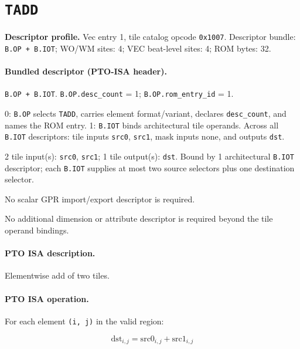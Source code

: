 \section{\texttt{TADD}}
\noindent\textbf{Descriptor profile.} Vec entry 1, tile catalog opcode \texttt{0x1007}. Descriptor bundle: \texttt{B.OP + B.IOT}; WO/WM sites: 4; VEC beat-level sites: 4; ROM bytes: 32.\par\smallskip
{}
\paragraph{Bundled descriptor (PTO-ISA header).}
\begin{description}[leftmargin=0.18\linewidth,style=nextline]
\item[Bundle] \texttt{B.OP + B.IOT}. \texttt{B.OP.desc\_count} = 1; \texttt{B.OP.rom\_entry\_id} = 1.
\item[Assembly] 0: \texttt{B.OP} selects \texttt{TADD}, carries element format/variant, declares \texttt{desc\_count}, and names the ROM entry. 1: \texttt{B.IOT} binds architectural tile operands. Across all \texttt{B.IOT} descriptors: tile inputs \texttt{src0}, \texttt{src1}, mask inputs none, and outputs \texttt{dst}.
\item[Tile operands] 2 tile input(s): \texttt{src0}, \texttt{src1}; 1 tile output(s): \texttt{dst}. Bound by 1 architectural \texttt{B.IOT} descriptor; each \texttt{B.IOT} supplies at most two source selectors plus one destination selector.
\item[Scalar GPR operands] No scalar GPR import/export descriptor is required.
\item[Metadata operands] No additional dimension or attribute descriptor is required beyond the tile operand bindings.
\end{description}
\par\smallskip
{\small
\paragraph{PTO ISA description.}
Elementwise add of two tiles.
\paragraph{PTO ISA operation.}
For each element \texttt{(i, j)} in the valid region:

\[
\mathrm{dst}_{i,j} = \mathrm{src0}_{i,j} + \mathrm{src1}_{i,j}
\]
}\par\smallskip
